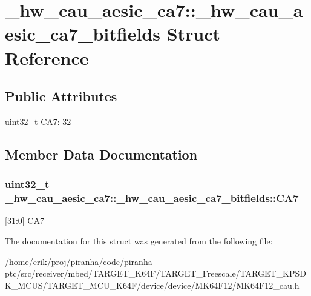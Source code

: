 \hypertarget{struct__hw__cau__aesic__ca7_1_1__hw__cau__aesic__ca7__bitfields}{}\section{\+\_\+hw\+\_\+cau\+\_\+aesic\+\_\+ca7\+:\+:\+\_\+hw\+\_\+cau\+\_\+aesic\+\_\+ca7\+\_\+bitfields Struct Reference}
\label{struct__hw__cau__aesic__ca7_1_1__hw__cau__aesic__ca7__bitfields}
\subsection*{Public Attributes}
\begin{DoxyCompactItemize}
\item 
uint32\+\_\+t \hyperlink{struct__hw__cau__aesic__ca7_1_1__hw__cau__aesic__ca7__bitfields_a0d2f1c8a1f475d5e7416ff0dac3f5c14}{C\+A7}\+: 32
\end{DoxyCompactItemize}


\subsection{Member Data Documentation}
\subsubsection[{\texorpdfstring{C\+A7}{CA7}}]{\setlength{\rightskip}{0pt plus 5cm}uint32\+\_\+t \+\_\+hw\+\_\+cau\+\_\+aesic\+\_\+ca7\+::\+\_\+hw\+\_\+cau\+\_\+aesic\+\_\+ca7\+\_\+bitfields\+::\+C\+A7}\hypertarget{struct__hw__cau__aesic__ca7_1_1__hw__cau__aesic__ca7__bitfields_a0d2f1c8a1f475d5e7416ff0dac3f5c14}{}\label{struct__hw__cau__aesic__ca7_1_1__hw__cau__aesic__ca7__bitfields_a0d2f1c8a1f475d5e7416ff0dac3f5c14}
\mbox{[}31\+:0\mbox{]} C\+A7 

The documentation for this struct was generated from the following file\+:\begin{DoxyCompactItemize}
\item 
/home/erik/proj/piranha/code/piranha-\/ptc/src/receiver/mbed/\+T\+A\+R\+G\+E\+T\+\_\+\+K64\+F/\+T\+A\+R\+G\+E\+T\+\_\+\+Freescale/\+T\+A\+R\+G\+E\+T\+\_\+\+K\+P\+S\+D\+K\+\_\+\+M\+C\+U\+S/\+T\+A\+R\+G\+E\+T\+\_\+\+M\+C\+U\+\_\+\+K64\+F/device/device/\+M\+K64\+F12/M\+K64\+F12\+\_\+cau.\+h\end{DoxyCompactItemize}
